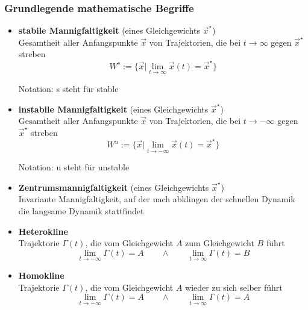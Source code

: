 \documentclass{article}
\begin{document}
\subsubsection{Grundlegende mathematische Begriffe}
	\begin{itemize}
		\item \textbf{stabile Mannigfaltigkeit} (eines Gleichgewichts $\vec{x}^\star$)\\
		Gesamtheit aller Anfangspunkte $\vec{x}$ von Trajektorien, die bei $t \to \infty$ gegen $\vec{x}^\star$ streben
			\begin{equation}
				W^s := \{ \vec{x} | \lim_{t \to \infty} \vec{x}(t) = \vec{x}^\star \}
			\end{equation}
		
		\textcolor{gruen}{Notation: s steht für stable}
		
		
		\item \textbf{instabile Mannigfaltigkeit} (eines Gleichgewichts $\vec{x}^\star$)\\
		Gesamtheit aller Anfangspunkte $\vec{x}$ von Trajektorien, die bei $t \to -\infty$ gegen $\vec{x}^\star$ streben
			\begin{equation}
				W^u := \{ \vec{x} | \lim_{t \to -\infty} \vec{x}(t) = \vec{x}^\star \}
			\end{equation}
		
		\textcolor{gruen}{Notation: u steht für unstable}
		
		
		\item \textbf{Zentrumsmannigfaltigkeit} (eines Gleichgewichts $\vec{x}^\star$)\\
		Invariante Mannigfaltigkeit, auf der nach abklingen der schnellen Dynamik die langsame Dynamik stattfindet
		
		
		\item \textbf{Heterokline}\\
		Trajektorie $\Gamma(t)$, die vom Gleichgewicht $A$ zum Gleichgewicht $B$ führt
			\begin{equation}
				\lim_{t \to -\infty} \Gamma(t) = A \qquad \wedge \qquad \lim_{t \to \infty} \Gamma(t) = B
			\end{equation}
		
		
		\item \textbf{Homokline}\\
		Trajektorie $\Gamma(t)$, die vom Gleichgewicht $A$ wieder zu sich selber führt
			\begin{equation}
				\lim_{t \to -\infty} \Gamma(t) = A \qquad \wedge \qquad \lim_{t \to \infty} \Gamma(t) = A
			\end{equation}
	\end{itemize}
\end{document}
